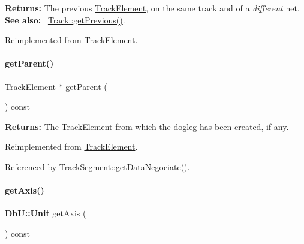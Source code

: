 {\bfseries Returns\+:} The previous \mbox{\hyperlink{classKite_1_1TrackElement}{Track\+Element}}, on the same track and of a {\itshape different} net. {\bfseries See also\+:}~ \mbox{\hyperlink{classKite_1_1Track_a290fcfe6131730d216951a3b5207d777}{Track\+::get\+Previous()}}. 

Reimplemented from \mbox{\hyperlink{classKite_1_1TrackElement_a55d6115d84c11ad147f4c38fe372ea24}{Track\+Element}}.

\mbox{\label{classKite_1_1TrackSegment_a95ec3b8e7e1ec87c20ee0b37bcc96df7}} 
\paragraph{\texorpdfstring{get\+Parent()}{getParent()}}
{\footnotesize\ttfamily \mbox{\hyperlink{classKite_1_1TrackElement}{Track\+Element}} $\ast$ get\+Parent (\begin{DoxyParamCaption}{ }\end{DoxyParamCaption}) const\hspace{0.3cm}{\ttfamily [virtual]}}

{\bfseries Returns\+:} The \mbox{\hyperlink{classKite_1_1TrackElement}{Track\+Element}} from which the dogleg has been created, if any. 

Reimplemented from \mbox{\hyperlink{classKite_1_1TrackElement_a95ec3b8e7e1ec87c20ee0b37bcc96df7}{Track\+Element}}.



Referenced by Track\+Segment\+::get\+Data\+Negociate().

\mbox{\label{classKite_1_1TrackSegment_ab5b5aaa5b318369feee6003dbad039c2}} 
\paragraph{\texorpdfstring{get\+Axis()}{getAxis()}}
{\footnotesize\ttfamily \textbf{ Db\+U\+::\+Unit} get\+Axis (\begin{DoxyParamCaption}{ }\end{DoxyParamCaption}) const\hspace{0.3cm}{\ttfamily [virtual]}}

